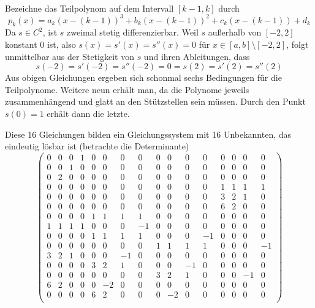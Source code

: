 \documentclass[a4paper]{scrartcl}
\begin{document}
\begin{aufgabe}~

	Bezeichne das Teilpolynom auf dem Intervall $[k-1,k]$ durch
	\[
		p_k(x) = a_k(x-(k-1))^3 + b_k(x-(k-1))^2 + c_k(x-(k-1)) + d_k
	\]
	Da $s\in C^2$, ist $s$ zweimal stetig differenzierbar.
	Weil $s$ außerhalb von $[-2,2]$ konstant $0$ ist, also $s(x)=s'(x)=s''(x)=0$ für $x\in [a,b]\setminus [-2,2]$, folgt unmittelbar aus der Stetigkeit von $s$ und ihren Ableitungen, dass
	\[
		s(-2) = s'(-2) = s''(-2) = 0 = s(2) = s'(2) = s''(2)
	\]
	Aus obigen Gleichungen ergeben sich schonmal sechs Bedingungen für die Teilpolynome.
	Weitere neun erhält man, da die Polynome jeweils zusammenhängend und glatt an den Stützstellen sein müssen.
	Durch den Punkt $s(0) = 1$ erhält dann die letzte.

	Diese 16 Gleichungen bilden ein Gleichungssystem mit 16 Unbekannten, das eindeutig lösbar ist (betrachte die Determinante)
	\setcounter{MaxMatrixCols}{16}
	\[
		\begin{pmatrix}
			0 & 0 & 0 & 1 & 0 & 0 & 0 & 0 & 0 & 0 & 0 & 0 & 0 & 0 & 0 & 0 \\
			0 & 0 & 1 & 0 & 0 & 0 & 0 & 0 & 0 & 0 & 0 & 0 & 0 & 0 & 0 & 0 \\
			0 & 2 & 0 & 0 & 0 & 0 & 0 & 0 & 0 & 0 & 0 & 0 & 0 & 0 & 0 & 0 \\
			0 & 0 & 0 & 0 & 0 & 0 & 0 & 0 & 0 & 0 & 0 & 0 & 1 & 1 & 1 & 1 \\
			0 & 0 & 0 & 0 & 0 & 0 & 0 & 0 & 0 & 0 & 0 & 0 & 3 & 2 & 1 & 0 \\
			0 & 0 & 0 & 0 & 0 & 0 & 0 & 0 & 0 & 0 & 0 & 0 & 6 & 2 & 0 & 0 \\
			0 & 0 & 0 & 0 & 1 & 1 & 1 & 1 & 0 & 0 & 0 & 0 & 0 & 0 & 0 & 0 \\
			1 & 1 & 1 & 1 & 0 & 0 & 0 &-1 & 0 & 0 & 0 & 0 & 0 & 0 & 0 & 0 \\
			0 & 0 & 0 & 0 & 1 & 1 & 1 & 1 & 0 & 0 & 0 &-1 & 0 & 0 & 0 & 0 \\
			0 & 0 & 0 & 0 & 0 & 0 & 0 & 0 & 1 & 1 & 1 & 1 & 0 & 0 & 0 &-1 \\
			3 & 2 & 1 & 0 & 0 & 0 &-1 & 0 & 0 & 0 & 0 & 0 & 0 & 0 & 0 & 0 \\
			0 & 0 & 0 & 0 & 3 & 2 & 1 & 0 & 0 & 0 &-1 & 0 & 0 & 0 & 0 & 0 \\
			0 & 0 & 0 & 0 & 0 & 0 & 0 & 0 & 3 & 2 & 1 & 0 & 0 & 0 &-1 & 0 \\
			6 & 2 & 0 & 0 & 0 &-2 & 0 & 0 & 0 & 0 & 0 & 0 & 0 & 0 & 0 & 0 \\
			0 & 0 & 0 & 0 & 6 & 2 & 0 & 0 & 0 &-2 & 0 & 0 & 0 & 0 & 0 & 0 \\

\end{pmatrix}\]
\end{aufgabe}
\end{document}
